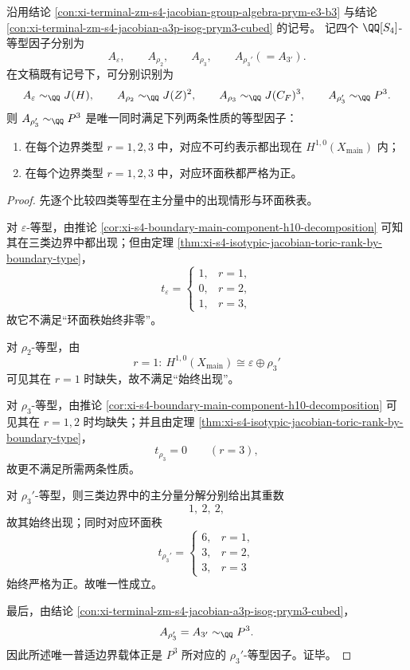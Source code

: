 \begin{theorem}\label{thm:conclusion-s4-rho3prime-unique-universal-boundary-carrier}
沿用结论 \ref{con:xi-terminal-zm-s4-jacobian-group-algebra-prym-e3-b3} 与结论 \ref{con:xi-terminal-zm-s4-jacobian-a3p-isog-prym3-cubed} 的记号。
记四个 \(\QQ[S_4]\)-等型因子分别为
\[
A_{\varepsilon},\qquad A_{\rho_2},\qquad A_{\rho_3},\qquad A_{\rho_3'}(=A_{3'}).
\]
在文稿既有记号下，可分别识别为
\[
A_{\varepsilon}\sim_{\QQ}J(H),\qquad
A_{\rho_2}\sim_{\QQ}J(Z)^2,\qquad
A_{\rho_3}\sim_{\QQ}J(C_F)^3,\qquad
A_{\rho_3'}\sim_{\QQ}P^3.
\]
则 \(A_{\rho_3'}\sim_{\QQ}P^3\) 是唯一同时满足下列两条性质的等型因子：
\begin{enumerate}
  \item 在每个边界类型 \(r=1,2,3\) 中，对应不可约表示都出现在 \(H^{1,0}(X_{\mathrm{main}})\) 内；
  \item 在每个边界类型 \(r=1,2,3\) 中，对应环面秩都严格为正。
\end{enumerate}
\end{theorem}
\begin{proof}
先逐个比较四类等型在主分量中的出现情形与环面秩表。

对 \(\varepsilon\)-等型，由推论 \ref{cor:xi-s4-boundary-main-component-h10-decomposition} 可知其在三类边界中都出现；但由定理 \ref{thm:xi-s4-isotypic-jacobian-toric-rank-by-boundary-type}，
\[
t_{\varepsilon}=
\begin{cases}
1,& r=1,\\
0,& r=2,\\
1,& r=3,
\end{cases}
\]
故它不满足“环面秩始终非零”。

对 \(\rho_2\)-等型，由
\[
r=1:\ H^{1,0}(X_{\mathrm{main}})\cong \varepsilon\oplus \rho_3'
\]
可见其在 \(r=1\) 时缺失，故不满足“始终出现”。

对 \(\rho_3\)-等型，由推论 \ref{cor:xi-s4-boundary-main-component-h10-decomposition} 可见其在 \(r=1,2\) 时均缺失；并且由定理 \ref{thm:xi-s4-isotypic-jacobian-toric-rank-by-boundary-type}，
\[
t_{\rho_3}=0
\qquad (r=3),
\]
故更不满足所需两条性质。

对 \(\rho_3'\)-等型，则三类边界中的主分量分解分别给出其重数
\[
1,\ 2,\ 2,
\]
故其始终出现；同时对应环面秩
\[
t_{\rho_3'}=
\begin{cases}
6,& r=1,\\
3,& r=2,\\
3,& r=3
\end{cases}
\]
始终严格为正。故唯一性成立。

最后，由结论 \ref{con:xi-terminal-zm-s4-jacobian-a3p-isog-prym3-cubed}，
\[
A_{\rho_3'}=A_{3'}\sim_{\QQ}P^3.
\]
因此所述唯一普适边界载体正是 \(P^3\) 所对应的 \(\rho_3'\)-等型因子。证毕。
\end{proof}

